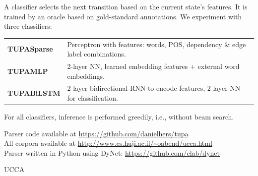 \documentclass[a0,portrait]{a0poster}
\begin{document}
\begin{multicols}{2}
A classifier selects the next transition based on the current state's features.
It is trained by an oracle based on gold-standard annotations.
We experiment with three classifiers:
\begin{flushleft}
	\begin{tabular}{ll}
	\textbf{TUPA{Sparse}} & Perceptron with features: words, POS, dependency \& edge label combinations. \\
	\textbf{TUPA{MLP}} & 2-layer NN, learned embedding features + external word embeddings. \\
	\textbf{TUPA{BiLSTM}} & 2-layer bidirectional RNN to encode features, 2-layer NN for classification. \\
	\end{tabular}
\end{flushleft}
\vspace{5mm}
For all classifiers, inference is performed greedily, i.e., without beam search.

Parser code available at \url{https://github.com/danielhers/tupa}\\
All corpora available at \url{http://www.cs.huji.ac.il/~oabend/ucca.html}\\
Parser written in Python using DyNet: \url{https://github.com/clab/dynet}

\begin{center}
  \caption{UCCA}
  

\end{center}
\end{multicols}
\end{document}
